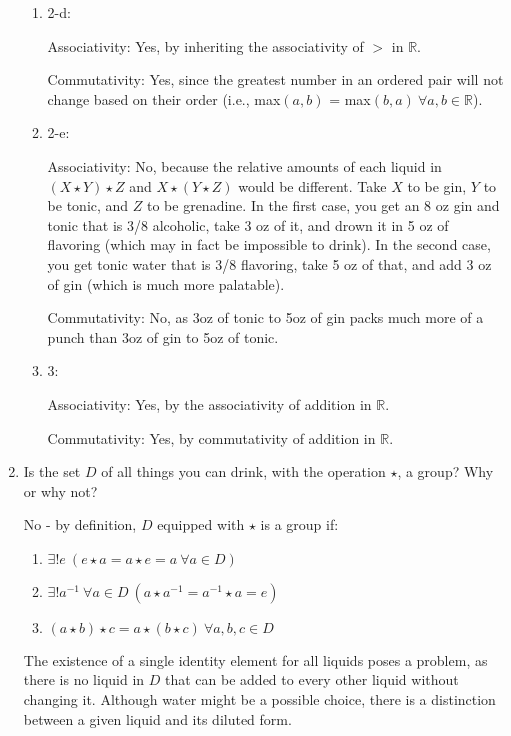 \documentclass{scrartcl}
\begin{document}
\begin{enumerate}
\begin{enumerate}
				\item 2-d: 
				
					Associativity: Yes, by inheriting the associativity of $>$ in $\mathbb{R}$.
					
					Commutativity: Yes, since the greatest number in an ordered pair will not change based on their order (i.e., max$(a,b)$ = max$(b,a)\ \forall a,b\in \mathbb{R}$).
					
				\item 2-e:
					
					Associativity: No, because the relative amounts of each liquid in $(X\star Y)\star Z$ and $X\star (Y\star Z)$ would be different. Take $X$ to be gin, $Y$ to be tonic, and $Z$ to be grenadine. In the first case, you get an 8 oz gin and tonic that is 3/8 alcoholic, take 3 oz of it, and drown it in 5 oz of flavoring (which may in fact be impossible to drink). In the second case, you get tonic water that is 3/8 flavoring, take 5 oz of that, and add 3 oz of gin (which is much more palatable).
						
					Commutativity: No, as 3oz of tonic to 5oz of gin packs much more of a punch than 3oz of gin to 5oz of tonic.
						
						\item 3: 
						
							Associativity: Yes, by the associativity of addition in $\mathbb{R}$.
							
							Commutativity: Yes, by commutativity of addition in $\mathbb{R}$.
						
		\end{enumerate}
	
	\item Is the set $D$ of all things you can drink, with the operation $\star$, a group? Why or why not?
	
		No - by definition, $D$ equipped with $\star$ is a group if:
		\begin{enumerate}
			\item $\exists ! e\ (e\star a = a\star e = a\ \forall a \in D)$
			\item $\exists ! a^{-1}\ \forall a \in D\ (a\star a^{-1} = a^{-1}\star a = e)$
			\item $(a\star b)\star c = a\star (b\star c)\ \forall a,b,c \in D$
		\end{enumerate}
		
		
		The existence of a single identity element for all liquids poses a problem, as there is no liquid in $D$ that can be added to every other liquid without changing it. Although water might be a possible choice, there is a distinction between a given liquid and its diluted form.
		

\end{enumerate}
\end{document}
